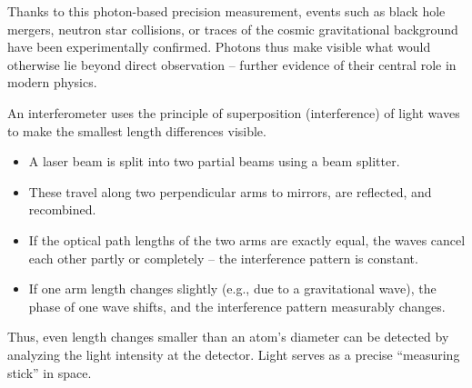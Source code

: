 \vspace{0.5em}
Thanks to this photon-based precision measurement, events such as black hole mergers, neutron star collisions, or traces of the cosmic gravitational background have been experimentally confirmed. Photons thus make visible what would otherwise lie beyond direct observation – further evidence of their central role in modern physics.
\newpage
\noindent
\vspace{1em}
\begin{tcolorbox}[didaktikbox, title=How Does an Interferometer Work? \label{box:interferometer}]
	\small
	An interferometer uses the principle of superposition (interference) of light waves to make the smallest length differences visible. 
	
	\begin{itemize}
		\item A laser beam is split into two partial beams using a beam splitter.
		\item These travel along two perpendicular arms to mirrors, are reflected, and recombined.
		\item If the optical path lengths of the two arms are exactly equal, the waves cancel each other partly or completely – the interference pattern is constant.
		\item If one arm length changes slightly (e.g., due to a gravitational wave), the phase of one wave shifts, and the interference pattern measurably changes.
	\end{itemize}
	
	Thus, even length changes smaller than an atom’s diameter can be detected by analyzing the light intensity at the detector. Light serves as a precise “measuring stick” in space.
\end{tcolorbox}

